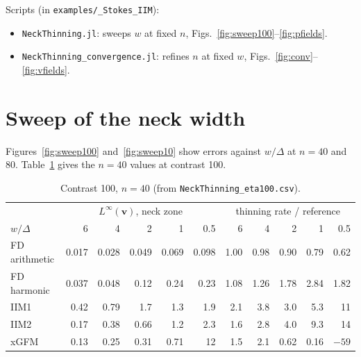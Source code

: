 \documentclass[11pt,a4paper]{article}
\newcommand{\code}[1]{\texttt{#1}}
\begin{document}
Scripts (in \code{examples/\_Stokes\_IIM}):
\begin{itemize}
  \item \code{NeckThinning.jl}: sweeps $w$ at fixed $n$, Figs.~\ref{fig:sweep100}--\ref{fig:pfields}.
  \item \code{NeckThinning\_convergence.jl}: refines $n$ at fixed $w$,
    Figs.~\ref{fig:conv}--\ref{fig:vfields}.
\end{itemize}

\section{Sweep of the neck width}
Figures~\ref{fig:sweep100} and~\ref{fig:sweep10} show errors against $w/\Delta$ at $n = 40$ and
$80$. Table~\ref{tab:sweep} gives the $n = 40$ values at contrast 100.

\begin{table}[h]
\centering\small
\begin{tabular}{l rrrrr @{\hspace{1.5em}} rrrrr}
\toprule
 & \multicolumn{5}{c}{$L^\infty(\mathbf{v})$, neck zone} & \multicolumn{5}{c}{thinning rate / reference}\\
$w/\Delta$ & 6 & 4 & 2 & 1 & 0.5 & 6 & 4 & 2 & 1 & 0.5\\
\midrule
FD arithmetic & 0.017 & 0.028 & 0.049 & 0.069 & 0.098 & 1.00 & 0.98 & 0.90 & 0.79 & 0.62\\
FD harmonic   & 0.037 & 0.048 & 0.12  & 0.24  & 0.23  & 1.08 & 1.26 & 1.78 & 2.84 & 1.82\\
IIM1          & 0.42  & 0.79  & 1.7   & 1.3   & 1.9   & 2.1  & 3.8  & 3.0  & 5.3  & 11\\
IIM2          & 0.17  & 0.38  & 0.66  & 1.2   & 2.3   & 1.6  & 2.8  & 4.0  & 9.3  & 14\\
xGFM          & 0.13  & 0.25  & 0.31  & 0.71  & 12    & 1.5  & 2.1  & 0.62 & 0.16 & $-59$\\
\bottomrule
\end{tabular}
\caption{Contrast 100, $n = 40$ (from \code{NeckThinning\_eta100.csv}).}
\label{tab:sweep}
\end{table}
\end{document}
